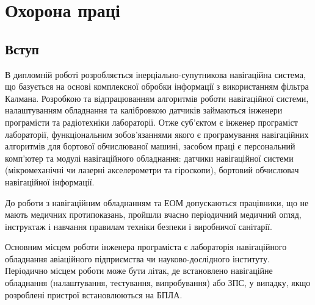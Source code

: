 % 
\section{Охорона праці}
\subsection{Вступ}

В дипломній роботі розробляється інерціально-супутникова навігаційна система, що базується на основі комплексної обробки інформації з використанням фільтра Калмана. Розробкою та відпрацюванням алгоритмів роботи навігаційної системи, налаштуванням обладнання та калібровкою датчиків займаються інженери програмісти та радіотехніки лабораторії. Отже суб’єктом є інженер програміст лабораторії, функціональним зобов'язаннями якого є програмування навігаційних алгоритмів для бортової обчислюваної машині, засобом праці є персональний комп'ютер та модулі навігаційного обладнання: датчики навігаційної системи (мікромеханічні чи лазерні акселерометри та гіроскопи), бортовий обчислювач навігаційної інформації.

До роботи з навігаційним обладнанням та ЕОМ допускаються працівники, що не мають медичних протипоказань, пройшли вчасно періодичний медичний огляд, інструктаж і навчання  правилам техніки безпеки і виробничої санітарії.

Основним місцем роботи інженера програміста є лабораторія навігаційного обладнання авіаційного підприємства чи науково-дослідного інституту. Періодично місцем роботи може бути літак, де встановлено навігаційне обладнання (налаштування, тестування, випробування) або ЗПС, у випадку, якщо розроблені пристрої встановлюються на БПЛА.

